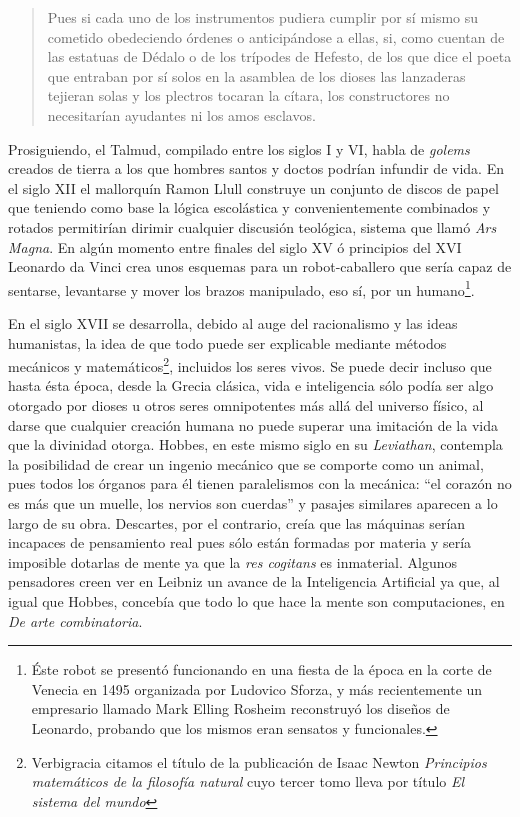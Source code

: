 \documentclass[12pt]{memoir}
\begin{document}
\begin{quotation}
Pues si cada uno de los instrumentos pudiera cumplir por sí mismo su cometido obedeciendo órdenes o anticipándose a ellas, si, como cuentan de las estatuas de Dédalo o de los trípodes de Hefesto, de los que dice el poeta que entraban por sí solos en la asamblea de los dioses las lanzaderas tejieran solas y los plectros tocaran la cítara, los constructores no necesitarían ayudantes ni los amos esclavos. \parencite[Aristot. Pol. 1.1253b]{aristotlePolitics}
\end{quotation}

Prosiguiendo, el Talmud, compilado entre los siglos I y VI, habla de \textit{golems} creados de tierra a los que hombres santos y doctos podrían infundir de vida. En el siglo XII el mallorquín Ramon Llull construye un conjunto de discos de papel que teniendo como base la lógica escolástica y convenientemente combinados y rotados permitirían dirimir cualquier discusión teológica, sistema que llamó \textit{Ars Magna}. En algún momento entre finales del siglo XV ó principios del XVI Leonardo da Vinci crea unos esquemas para un robot-caballero que sería capaz de sentarse, levantarse y mover los brazos manipulado, eso sí, por un humano\footnote{Éste robot se presentó funcionando en una fiesta de la época en la corte de Venecia en 1495 organizada por Ludovico Sforza, y más recientemente un empresario llamado Mark Elling Rosheim reconstruyó los diseños de Leonardo, probando que los mismos eran sensatos y funcionales.}. 

En el siglo XVII se desarrolla, debido al auge del racionalismo y las ideas humanistas, la idea de que todo puede ser explicable mediante métodos mecánicos y matemáticos\footnote{Verbigracia citamos el título de la publicación de Isaac Newton \textit{Principios matemáticos de la filosofía natural} cuyo tercer tomo lleva por título \textit{El sistema del mundo}}, incluidos los seres vivos. Se puede decir incluso que hasta ésta época, desde la Grecia clásica, vida e inteligencia sólo podía ser algo otorgado por dioses u otros seres omnipotentes más allá del universo físico, al darse que cualquier creación humana no puede superar una imitación de la vida que la divinidad otorga. Hobbes, en este mismo siglo en su \textit{Leviathan}, contempla la posibilidad de crear un ingenio mecánico que se comporte como un animal, pues todos los órganos para él tienen paralelismos con la mecánica: ``el corazón no es más que un muelle, los nervios son cuerdas'' y pasajes similares aparecen a lo largo de su obra. Descartes, por el contrario, creía que las máquinas serían incapaces de pensamiento real pues sólo están formadas por materia y sería imposible dotarlas de mente ya que la \textit{res cogitans} es inmaterial. Algunos pensadores creen ver en Leibniz un avance de la Inteligencia Artificial ya que, al igual que Hobbes, concebía que todo lo que hace la mente son computaciones, en \textit{De arte combinatoria}. 
\end{document}
